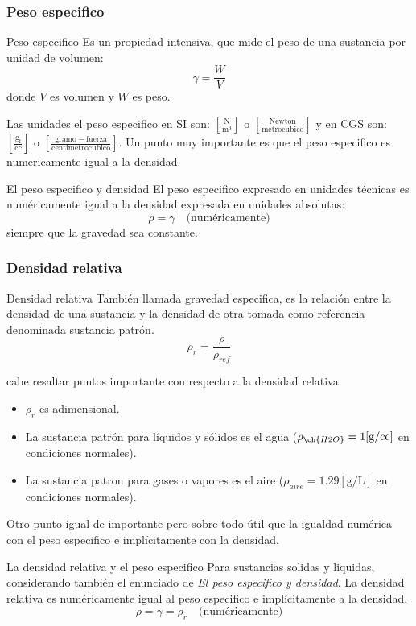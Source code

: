 \subsubsection*{Peso especifico}
\begin{Theorem*} {Peso especifico}
	Es un propiedad intensiva, que mide el peso de una sustancia por unidad de volumen:
	$$ \gamma=\frac{W}{V} $$
	donde $V$ es volumen y $W$ es peso.
\end{Theorem*}
Las unidades el peso especifico en SI son: $\mathrm{\left[\frac{N}{m^3}\right]}$ o $\mathrm{\left[\frac{Newton}{metro cubico}\right]}$ y en CGS son: $\mathrm{\left[\frac{g_f}{cc}\right]}$ o $\mathrm{\left[\frac{gramo-fuerza}{centimetro cubico}\right]}$.
Un punto muy importante es que el peso especifico es numericamente igual a la densidad.
\begin{Theorem*} {El peso especifico y densidad}
	El peso especifico expresado en unidades técnicas es numéricamente igual a la densidad expresada en unidades absolutas:
	$$ \rho = \gamma \quad \text{(numéricamente)} $$
	siempre que la gravedad sea constante.
\end{Theorem*}
\subsubsection*{Densidad relativa}
\begin{Theorem*} {Densidad relativa}
	También llamada gravedad especifica, es la relación entre la densidad de una sustancia y la densidad de otra tomada como referencia denominada sustancia patrón.
	$$ \rho_r=\frac{\rho}{\rho_{ref}} $$
\end{Theorem*}
cabe resaltar puntos importante con respecto a la densidad relativa
\begin{itemize}
	\item $\rho_r$ es adimensional.
	\item La sustancia patrón para líquidos y sólidos es el agua ($\rho_{\ch{H2O}}=1\mathrm{[g/cc]}$ en condiciones normales).
	\item La sustancia patron para gases o vapores es el aire ($\rho_{aire}=1.29\mathrm{[g/L]}$ en condiciones normales).
\end{itemize}
Otro punto igual de importante pero sobre todo útil que la igualdad numérica con el peso especifico e implícitamente con la densidad.
\begin{Theorem*} {La densidad relativa y el peso especifico}
	Para sustancias solidas y liquidas, considerando también el enunciado de \textit{El peso especifico y densidad}. La densidad relativa es numéricamente igual al peso especifico e implícitamente a la densidad.
	$$ \rho=\gamma=\rho_r \quad \text{(numéricamente)} $$
\end{Theorem*}
